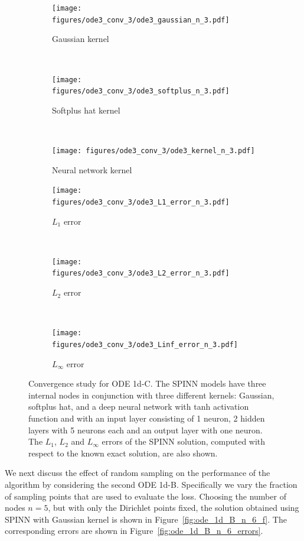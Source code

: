 \documentclass[12pt]{article}
\begin{document}
\begin{figure}
\begin{subfigure}{0.32\textwidth}
\centering
\texttt{[image: figures/ode3\_conv\_3/ode3\_gaussian\_n\_3.pdf]}
\caption{Gaussian kernel}
\label{fig:ode3_gaussian_n_3}
\end{subfigure}
~
\begin{subfigure}{0.32\textwidth}
\centering
\texttt{[image: figures/ode3\_conv\_3/ode3\_softplus\_n\_3.pdf]}
\caption{Softplus hat kernel}
\label{fig:ode3_softplus_n_3}    
\end{subfigure}
~
\begin{subfigure}{0.32\textwidth}
\centering
\texttt{[image: figures/ode3\_conv\_3/ode3\_kernel\_n\_3.pdf]}
\caption{Neural network kernel}
\label{fig:ode3_kernel_n_3}    
\end{subfigure}
\begin{subfigure}{0.32\textwidth}
\centering
\texttt{[image: figures/ode3\_conv\_3/ode3\_L1\_error\_n\_3.pdf]}
\caption{$L_1$ error}
\label{fig:ode3_L1_n_3}  
\end{subfigure}
~
\begin{subfigure}{0.32\textwidth}
\centering
\texttt{[image: figures/ode3\_conv\_3/ode3\_L2\_error\_n\_3.pdf]}
\caption{$L_2$ error}
\label{fig:ode3_L2_n_3}      
\end{subfigure}
~
\begin{subfigure}{0.32\textwidth}
\centering
\texttt{[image: figures/ode3\_conv\_3/ode3\_Linf\_error\_n\_3.pdf]}
\caption{$L_{\infty}$ error}
\label{fig:ode3_Linf_n_3_full}      
\end{subfigure}
\caption{Convergence study for ODE 1d-C. The SPINN models have three internal nodes in conjunction with three different kernels: Gaussian, softplus hat, and a deep neural network with tanh activation function and with an input layer consisting of 1 neuron, 2 hidden layers with 5 neurons each and an output layer with one neuron. The $L_1$, $L_2$ and $L_{\infty}$ errors of the SPINN solution, computed with respect to the known exact solution, are also shown.}
\label{fig:ode_1d_C_n_3}
\end{figure}

We next discuss the effect of random sampling on the performance of the algorithm by considering the second ODE 1d-B. Specifically we vary the fraction of sampling points that are used to evaluate the loss. Choosing the number of nodes $n=5$, but with only the Dirichlet points fixed, the solution obtained using SPINN with Gaussian kernel is shown in Figure~\ref{fig:ode_1d_B_n_6_f}. The corresponding errors are shown in Figure~\ref{fig:ode_1d_B_n_6_errors}.
\end{document}
